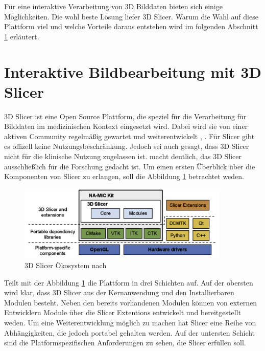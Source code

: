 Für eine interaktive Verarbeitung von 3D Bilddaten bieten sich einige
Möglichkeiten. Die wohl beste Lösung liefer 3D Slicer. Warum die Wahl auf diese
Plattform viel und welche Vorteile daraus entstehen wird im folgenden Abschnitt
\ref{sec:3d_slicer} erläutert.

\pagebreak

\section{Interaktive Bildbearbeitung mit 3D Slicer}
\label{sec:3d_slicer} 3D Slicer ist eine Open Source Plattform, die speziel für
die Verarbeitung für Bilddaten im medizinischen Kontext eingesetzt wird. Dabei wird
sie von einer aktiven Community regelmäßig gewartet und weiterentwickelt \citep[vgl.][]{slicer2024},
\citep[vgl.][]{fedorov2012slicer}. Für Slicer gibt es offizell keine Nutzungsbeschränkung.
Jedoch sei auch gesagt, dass 3D Slicer nicht für die klinische Nutzung zugelassen
ist. \citet{fedorov2012slicer} macht deutlich, das 3D Slicer ausschließlich für
die Forschung gedacht ist. Um einen ersten Überblick über die Komponenten von Slicer
zu erlangen, soll die Abbildung \ref{fig:3d_slicer_oekosystem} betrachtet weden.

\begin{figure}[h]
	\centering
	\includegraphics[width=0.9\textwidth]{img/3d_slicer_overview.jpg}
	\caption{3D Slicer Ökosystem nach \citet[Seite 1326]{fedorov2012slicer}}
	\label{fig:3d_slicer_oekosystem}
\end{figure}

\citet[Seite 1326]{fedorov2012slicer} Teilt mit der Abbildung \ref{fig:3d_slicer_oekosystem}
die Plattform in drei Schichten auf. Auf der obersten wird klar, dass 3D Slicer aus
der Kernanwendung und den Installierbaren Modulen besteht. Neben den bereits
vorhandenen Modulen können von externen Entwicklern Module über die Slicer
Extentions entwickelt und bereitgestellt weden. Um eine Weiterentwicklung möglich
zu machen hat Slicer eine Reihe von Abhängigkeiten, die jedoch portabel gehalten
werden. Auf der untersten Schicht sind die Platformspezifischen Anforderungen zu
sehen, die Slicer erfüllen soll.

